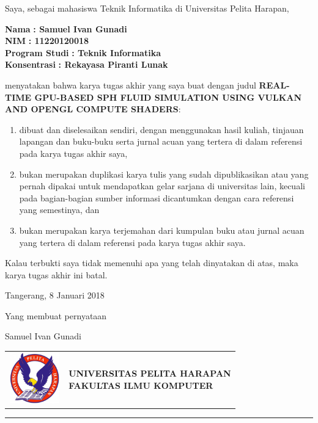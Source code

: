 \documentclass[a4paper, 12pt, oneside]{book}
\begin{document}
\begin{onehalfspace}
    \noindent Saya, sebagai mahasiswa Teknik Informatika di Universitas Pelita Harapan,
    
    \begin{tabbing}
        \hspace{3cm}\=\textbf{Nama} \hspace{2cm}\= \textbf{: Samuel Ivan Gunadi} \\
        \>\textbf{NIM} \> \textbf{: 11220120018} \\
        \>\textbf{Program Studi} \> \textbf{: Teknik Informatika} \\
        \>\textbf{Konsentrasi} \> \textbf{: Rekayasa Piranti Lunak}
    \end{tabbing}
    
    \noindent menyatakan bahwa karya tugas akhir yang saya buat dengan judul {\bfseries\MakeTextUppercase{Real-Time GPU-Based SPH Fluid Simulation Using Vulkan and OpenGL Compute Shaders}}:
    
    \begin{enumerate}
        \item dibuat dan diselesaikan sendiri, dengan menggunakan hasil kuliah, tinjauan lapangan dan buku-buku serta jurnal acuan yang tertera di dalam referensi pada karya tugas akhir saya,
        \item bukan merupakan duplikasi karya tulis yang sudah dipublikasikan atau yang pernah dipakai untuk mendapatkan gelar sarjana di universitas lain, kecuali pada bagian-bagian sumber informasi dicantumkan dengan cara referensi yang semestinya, dan
        \item bukan merupakan karya terjemahan dari kumpulan buku atau jurnal acuan yang tertera di dalam referensi pada karya tugas akhir saya.
    \end{enumerate}
    \noindent Kalau terbukti saya tidak memenuhi apa yang telah dinyatakan di atas, maka karya tugas akhir ini batal.
    \begin{flushright}
        Tangerang, 8 Januari 2018
        
        Yang membuat pernyataan
        
        \vspace{3\baselineskip}
        Samuel Ivan Gunadi
    \end{flushright}
\end{onehalfspace}
\clearpage


\noindent
\begin{tabu} to 
    \includegraphics[width=2.2cm, height=2.2cm]{images/uph_logo.png} & {\bfseries\Large UNIVERSITAS PELITA HARAPAN \newline FAKULTAS ILMU KOMPUTER} \\
\end{tabu}
\noindent\rule{\textwidth}{1mm}
\end{document}
